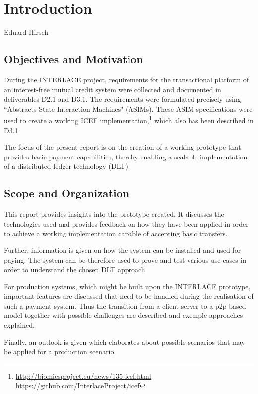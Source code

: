 \chapter{Introduction}
\label{ch:Introduction}

\vspace{-1cm}
\begin{center}
Eduard Hirsch
\end{center}


\section{Objectives and Motivation}

During the INTERLACE project, requirements for the transactional platform of an interest-free mutual credit system were collected and documented in deliverables D2.1\cite{INTERLACE_D21} and D3.1\cite{INTERLACE_D31}. The requirements were formulated precisely using ``Abstracts State Interaction Machines" (ASIMs). These ASIM specifications were used to create a working ICEF implementation,\footnote{\url{http://biomicsproject.eu/news/135-icef.html}\\ \url{https://github.com/InterlaceProject/icef}} which also has been described in D3.1.

The focus of the present report is on the creation of a working prototype that provides basic payment capabilities, thereby enabling a scalable implementation of a distributed ledger technology (DLT).

\section{Scope and Organization}
This report provides insights into the prototype created. It discusses the technologies used and provides feedback on how they have been applied in order to achieve a working implementation capable of accepting basic transfers.

Further, information is given on how the system can be installed and used for paying. The system can be therefore used to prove and test various use cases in order to understand the chosen DLT approach.

For production systems, which might be built upon the INTERLACE prototype, important features are discussed that need to be handled during the realisation of such a payment system. Thus the transition from a client-server to a p2p-based model together with possible challenges are described and exemple approaches explained.

Finally, an outlook is given which elaborates about possible scenarios that may be applied for a production scenario.

\newpage
